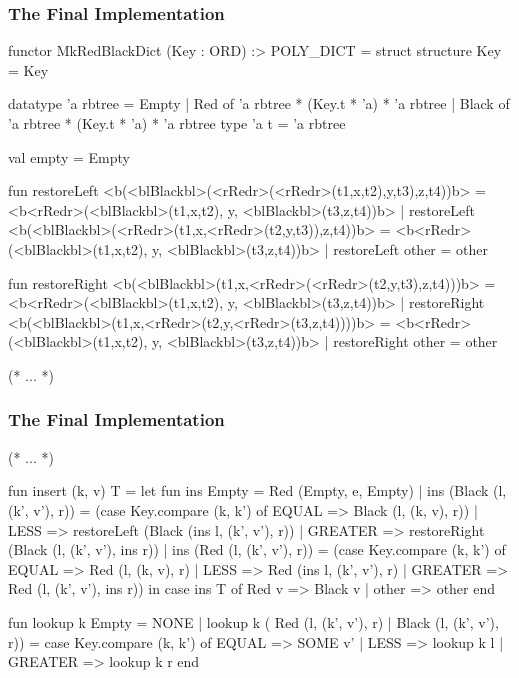 \documentclass[aspectratio=169, handout]{beamer}
\begin{document}
\begin{frame}[fragile]
  \frametitle{The Final Implementation}

  \tiny

  \begin{codeblock}
    functor MkRedBlackDict (Key : ORD) :> POLY_DICT =
      struct
        structure Key = Key

        datatype 'a rbtree =
            Empty
          | Red of 'a rbtree * (Key.t * 'a) * 'a rbtree
          | Black of 'a rbtree * (Key.t * 'a) * 'a rbtree
        type 'a t = 'a rbtree

        val empty = Empty

        fun restoreLeft <b(<blBlackbl>(<rRedr>(<rRedr>(t1,x,t2),y,t3),z,t4))b> =
              <b<rRedr>(<blBlackbl>(t1,x,t2), y, <blBlackbl>(t3,z,t4))b>
          | restoreLeft <b(<blBlackbl>(<rRedr>(t1,x,<rRedr>(t2,y,t3)),z,t4))b> =
              <b<rRedr>(<blBlackbl>(t1,x,t2), y, <blBlackbl>(t3,z,t4))b>
          | restoreLeft other = other

        fun restoreRight <b(<blBlackbl>(t1,x,<rRedr>(<rRedr>(t2,y,t3),z,t4)))b> =
              <b<rRedr>(<blBlackbl>(t1,x,t2), y, <blBlackbl>(t3,z,t4))b>
          | restoreRight <b(<blBlackbl>(t1,x,<rRedr>(t2,y,<rRedr>(t3,z,t4))))b> =
              <b<rRedr>(<blBlackbl>(t1,x,t2), y, <blBlackbl>(t3,z,t4))b>
          | restoreRight other = other

        (* ... *)
  \end{codeblock}
\end{frame}

\begin{frame}[fragile]
  \frametitle{The Final Implementation}

  \tiny
  \begin{codeblock}
    (* ... *)

        fun insert (k, v) T =
          let
            fun ins Empty = Red (Empty, e, Empty)
              | ins (Black (l, (k', v'), r)) =
                  (case Key.compare (k, k') of
                    EQUAL   => Black (l, (k, v), r))
                  | LESS    => restoreLeft (Black (ins l, (k', v'), r))
                  | GREATER => restoreRight (Black (l, (k', v'), ins r))
              | ins (Red (l, (k', v'), r)) =
                  (case Key.compare (k, k') of
                    EQUAL   => Red (l, (k, v), r)
                  | LESS    => Red (ins l, (k', v'), r)
                  | GREATER => Red (l, (k', v'), ins r))
          in
            case ins T of
              Red v => Black v
            | other => other
          end

        fun lookup k Empty = NONE
          | lookup k ( Red (l, (k', v'), r)
                     | Black (l, (k', v'), r)) =
              case Key.compare (k, k') of
                EQUAL   => SOME v'
              | LESS    => lookup k l
              | GREATER => lookup k r
      end
  \end{codeblock}
\end{frame}
\end{document}
